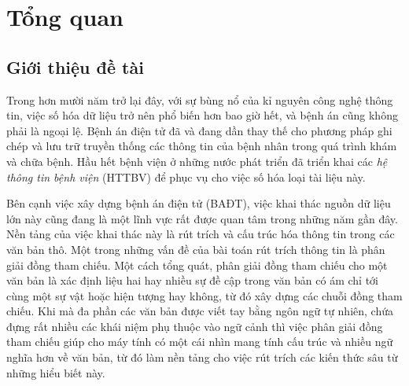 \chapter{Tổng quan}
\section{Giới thiệu đề tài\label{gioithieudetai}}
Trong hơn mười năm trở lại đây, với sự bùng nổ của kỉ nguyên công nghệ thông tin, việc số hóa dữ liệu trở nên phổ biến hơn bao giờ hết, và bệnh án cũng không phải là ngoại lệ. Bệnh án điện tử đã và đang dần thay thế cho phương pháp ghi chép và lưu trữ truyền thống các thông tin của bệnh nhân trong quá trình khám và chữa bệnh. Hầu hết bệnh viện ở những nước phát triển đã triển khai các \emph{hệ thông tin bệnh viện} (HTTBV) để phục vụ cho việc số hóa loại tài liệu này.


Bên cạnh việc xây dựng bệnh án điện tử (BAĐT), việc khai thác nguồn dữ liệu lớn này cũng đang là một lĩnh vực rất được quan tâm trong những năm gần đây. Nền tảng của việc khai thác này là rút trích và cấu trúc hóa thông tin trong các văn bản thô. Một trong những vấn đề của bài toán rút trích thông tin là phân giải đồng tham chiếu. Một cách tổng quát, phân giải đồng tham chiếu cho một văn bản là xác định liệu hai hay nhiều sự đề cập trong văn bản có ám chỉ tới cùng một sự vật hoặc hiện tượng hay không, từ đó xây dựng các chuỗi đồng tham chiếu. Khi mà đa phần các văn bản được viết tay bằng ngôn ngữ tự nhiên, chứa đựng rất nhiều các khái niệm phụ thuộc vào ngữ cảnh thì việc phân giải đồng tham chiếu giúp cho máy tính có một cái nhìn mang tính cấu trúc và nhiều ngữ nghĩa hơn về văn bản, từ đó làm nền tảng cho việc rút trích các kiến thức sâu từ những hiểu biết này.

